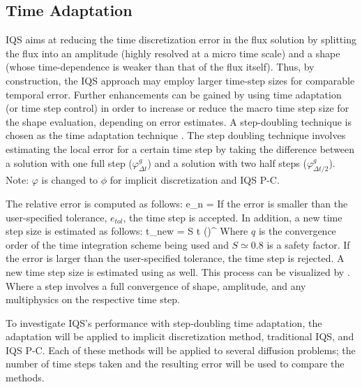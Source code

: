 \subsection{Time Adaptation}

IQS aims at reducing the time discretization error in the flux solution by splitting the flux into an amplitude (highly resolved at a micro time scale) and a shape (whose time-dependence is weaker than that of the flux itself). Thus, by construction, the IQS approach may employ larger time-step sizes for comparable temporal error. Further enhancements can be gained by using time adaptation (or time step control) in order to increase or reduce the macro time step size for the shape evaluation, depending on error estimates. A step-doubling technique is chosen as the time adaptation technique \cite{NumC}. The step doubling technique involves estimating the local error for a certain time step by taking the difference between a solution with one full step ($\varphi^g_{\Delta t}$) and a solution with two half steps ($\varphi^g_{\Delta t/2}$). Note: $\varphi$ is changed to $\phi$ for implicit discretization and IQS P-C.

The relative error is computed as follows:
\be
e_n = 
\label{eq:edt2}
\ee
If the error is smaller than the user-specified tolerance, $e_{tol}$, the time step is accepted. In addition, a new time step size is estimated as follows:
\be
\Delta t_{new} = S \Delta t \left(\right)^{}
\label{eq:dt2}
\ee
Where $q$ is the convergence order of the time integration scheme being used and $S\simeq 0.8$ is a safety factor. If the error is larger than the user-specified tolerance, the time step is rejected. A new time step size is estimated using   as well. This process can be visualized by .  Where a step involves a full convergence of shape, amplitude, and any multiphysics on the respective time step.

To investigate IQS's performance with step-doubling time adaptation, the adaptation will be applied to implicit discretization method, traditional IQS, and IQS P-C.  Each of these methods will be applied to several diffusion problems; the number of time steps taken and the resulting error will be used to compare the methods.

